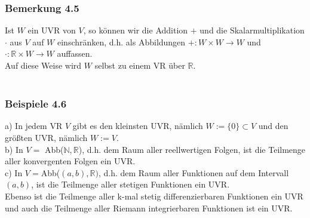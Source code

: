 \documentclass{article}
\begin{document}
\subsubsection*{Bemerkung 4.5}
Ist $W$ ein UVR von $V$, so können wir die Addition $+$ und die Skalarmultiplikation $\cdot$ aus $V$ auf $W$ einschränken, d.h. als Abbildungen $+: W \times W \rightarrow W$ und $\cdot: \mathbb{R} \times W \rightarrow W$ auffassen. \\
Auf diese Weise wird $W$ selbst zu einem VR über $\mathbb{R}$. \\
\\
\subsubsection*{Beispiele 4.6}
a) In jedem VR $V$ gibt es den kleinsten UVR, nämlich $W:= \{0\} \subset V$ und den größten UVR, nämlich $W:= V$. \\
b) In $V =$ Abb($\mathbb{N}, \mathbb{R}$), d.h. dem Raum aller reellwertigen Folgen, ist die Teilmenge aller konvergenten Folgen ein UVR. \\
c) In $V = $Abb($(a,b), \mathbb{R})$, d.h. dem Raum aller Funktionen auf dem Intervall $(a,b)$, ist die Teilmenge aller stetigen Funktionen ein UVR. \\
Ebenso ist die Teilmenge aller k-mal stetig differenzierbaren Funktionen ein UVR und auch die Teilmenge aller Riemann integrierbaren Funktionen ist ein UVR. \\
\\
\end{document}
